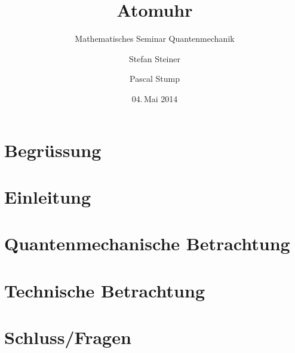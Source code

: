 \documentclass[compressd]
{beamer}
\title{Atomuhr}
\subtitle[MathSem QM]{Mathematisches Seminar Quantenmechanik}
\author{Stefan Steiner \and Pascal Stump}
\institute{HSR Hochschule für Technik Rapperswil}
\date{04.\,Mai 2014}
\begin{document}
	
	\begin{frame}
		\titlepage
	\end{frame}
	
	\section*{Begrüssung}
	
	
	\section{Einleitung}
	

		\section[Math]{Quantenmechanische Betrachtung}
	
	
	\section[Tech]{Technische Betrachtung}
	 
		
	\section[Schluss]{ Schluss/Fragen}
	
	
\end{document}
